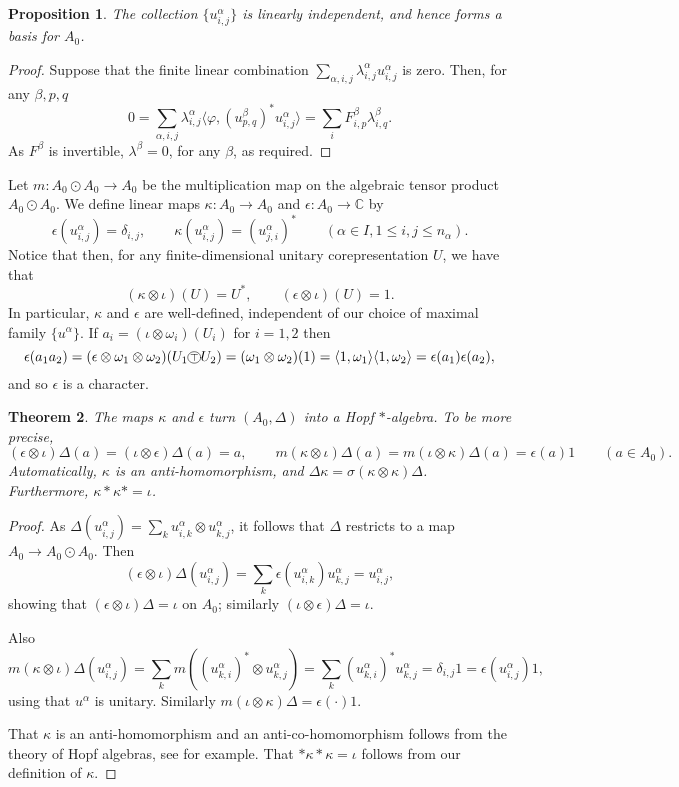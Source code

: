 \documentclass[twoside,a4paper,12pt]{article}
\theoremstyle{plain}
\newtheorem{proposition}{Proposition}[section]
\newtheorem{theorem}[proposition]{Theorem}
\theoremstyle{definition}
\newcommand{\ip}[2]{\langle #1,#2 \rangle}
\newcommand{\cotp}{\xymatrix{*+<.7ex>[o][F-]{\scriptstyle\top}}}
\begin{document}
\begin{proposition}\label{prop:basis_of_hopf}
The collection $\{ u^\alpha_{i,j} \}$ is linearly independent, and hence forms
a basis for $A_0$.
\end{proposition}
\begin{proof}
Suppose that the finite linear combination $\sum_{\alpha,i,j}
\lambda^\alpha_{i,j} u^\alpha_{i,j}$ is zero.  Then, for any $\beta,p,q$
\[ 0 = \sum_{\alpha,i,j} \lambda^\alpha_{i,j} 
\ip{\varphi}{(u^\beta_{p,q})^* u^\alpha_{i,j}}
= \sum_i F^\beta_{i,p} \lambda^\beta_{i,q}. \]
As $F^\beta$ is invertible, $\lambda^\beta=0$, for any $\beta$, as required.
\end{proof}

Let $m:A_0 \odot A_0\rightarrow A_0$ be the multiplication map on the
algebraic tensor product $A_0\odot A_0$.  We define linear maps $\kappa:
A_0\rightarrow A_0$ and $\epsilon:A_0\rightarrow\mathbb C$ by
\[ \epsilon(u^\alpha_{i,j}) = \delta_{i,j}, \qquad
\kappa(u^\alpha_{i,j}) = (u^\alpha_{j,i})^*
\qquad (\alpha\in I, 1\leq i,j\leq n_\alpha). \]
Notice that then, for any finite-dimensional unitary corepresentation
$U$, we have that
\[ (\kappa\otimes\iota)(U) = U^*, \qquad
(\epsilon\otimes\iota)(U) = 1. \]
In particular, $\kappa$ and $\epsilon$ are well-defined, independent of
our choice of maximal family $\{ u^\alpha \}$.
If $a_i=(\iota\otimes\omega_i)(U_i)$ for $i=1,2$ then
\[ \epsilon(a_1a_2) = (\epsilon\otimes\omega_1\otimes\omega_2)(U_1 \cotp U_2)
= (\omega_1\otimes\omega_2)(1) = \ip{1}{\omega_1} \ip{1}{\omega_2}
= \epsilon(a_1) \epsilon(a_2), \]
and so $\epsilon$ is a character.

\begin{theorem}\label{thm:ishopf}
The maps $\kappa$ and $\epsilon$ turn $(A_0,\Delta)$ into a Hopf $*$-algebra.
To be more precise,
\[ (\epsilon\otimes\iota)\Delta(a) = (\iota\otimes\epsilon)\Delta(a) = a,
\qquad m(\kappa\otimes\iota)\Delta(a) = m(\iota\otimes\kappa)\Delta(a)
= \epsilon(a) 1
\qquad (a\in A_0). \]
Automatically, $\kappa$ is an anti-homomorphism, and $\Delta\kappa
= \sigma(\kappa\otimes\kappa)\Delta$.  Furthermore, $\kappa * \kappa * = \iota$.
\end{theorem}
\begin{proof}
As $\Delta(u^\alpha_{i,j}) = \sum_k u^\alpha_{i,k} \otimes u^\alpha_{k,j}$,
it follows that $\Delta$ restricts to a map $A_0\rightarrow A_0\odot A_0$.
Then
\[ (\epsilon\otimes\iota)\Delta(u^\alpha_{i,j})
= \sum_k \epsilon(u^\alpha_{i,k}) u^\alpha_{k,j}
= u^\alpha_{i,j}, \]
showing that $(\epsilon\otimes\iota)\Delta=\iota$ on $A_0$;
similarly $(\iota\otimes\epsilon)\Delta=\iota$.

Also
\[ m(\kappa\otimes\iota)\Delta(u^\alpha_{i,j})
= \sum_k m((u^\alpha_{k,i})^* \otimes u^\alpha_{k,j})
= \sum_k (u^\alpha_{k,i})^*u^\alpha_{k,j} = \delta_{i,j} 1
= \epsilon(u^\alpha_{i,j}) 1, \]
using that $u^\alpha$ is unitary.  Similarly
$m(\iota\otimes\kappa)\Delta=\epsilon(\cdot) 1$.

That $\kappa$ is an anti-homomorphism and an anti-co-homomorphism follows
from the theory of Hopf algebras, see \cite[Section~1.3.3]{timm} for
example.  That $* \kappa * \kappa = \iota$ follows from our definition of
$\kappa$.
\end{proof}
\end{document}

